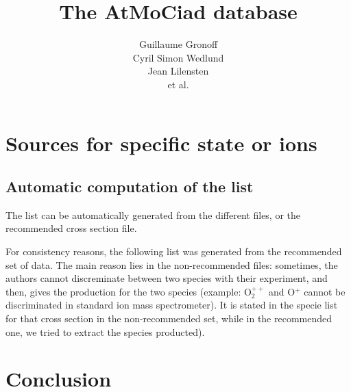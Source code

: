 \documentclass[a4paper,12pt]{book}
\author{Guillaume Gronoff \\ Cyril Simon Wedlund\\ Jean Lilensten \\ et al.}
\title{The \textbf{AtMoCiad} database}
\begin{document}
\maketitle
\tableofcontents



%







%


%
%

\chapter{Sources for specific state or ions}
\section{Automatic computation of the list}
The list can be automatically generated from the different files, or the recommended cross section file.

For consistency reasons, the following list was generated from the recommended set of data. The main reason lies in the non-recommended files: sometimes, the authors cannot discreminate between two species with their experiment, and then, gives the production for the two species (example: O$_2^{++}$ and O$^+$ cannot be discriminated in standard ion mass spectrometer). It is stated in the specie list for that cross section in the non-recommended set, while  in the recommended one, we tried to extract the species producted).


%






\chapter{Conclusion}
\end{document}
